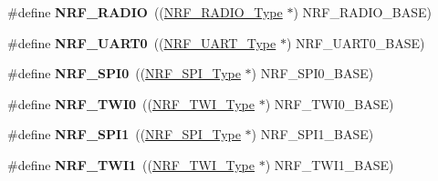 \begin{DoxyCompactItemize}
\item 
\hypertarget{group___device___peripheral___registers_ga41ac7a41fb74d5ba486e0a0bc98a16c8}{}\#define {\bfseries N\+R\+F\+\_\+\+R\+A\+D\+I\+O}~((\hyperlink{struct_n_r_f___r_a_d_i_o___type}{N\+R\+F\+\_\+\+R\+A\+D\+I\+O\+\_\+\+Type}          $\ast$) N\+R\+F\+\_\+\+R\+A\+D\+I\+O\+\_\+\+B\+A\+S\+E)\label{group___device___peripheral___registers_ga41ac7a41fb74d5ba486e0a0bc98a16c8}

\item 
\hypertarget{group___device___peripheral___registers_ga02c61604016794cbbc5963d52e18534f}{}\#define {\bfseries N\+R\+F\+\_\+\+U\+A\+R\+T0}~((\hyperlink{struct_n_r_f___u_a_r_t___type}{N\+R\+F\+\_\+\+U\+A\+R\+T\+\_\+\+Type}           $\ast$) N\+R\+F\+\_\+\+U\+A\+R\+T0\+\_\+\+B\+A\+S\+E)\label{group___device___peripheral___registers_ga02c61604016794cbbc5963d52e18534f}

\item 
\hypertarget{group___device___peripheral___registers_gaa5a6151368c81a6f039e758e61169995}{}\#define {\bfseries N\+R\+F\+\_\+\+S\+P\+I0}~((\hyperlink{struct_n_r_f___s_p_i___type}{N\+R\+F\+\_\+\+S\+P\+I\+\_\+\+Type}            $\ast$) N\+R\+F\+\_\+\+S\+P\+I0\+\_\+\+B\+A\+S\+E)\label{group___device___peripheral___registers_gaa5a6151368c81a6f039e758e61169995}

\item 
\hypertarget{group___device___peripheral___registers_gab9c8b3912be30b6f469babf985c16f33}{}\#define {\bfseries N\+R\+F\+\_\+\+T\+W\+I0}~((\hyperlink{struct_n_r_f___t_w_i___type}{N\+R\+F\+\_\+\+T\+W\+I\+\_\+\+Type}            $\ast$) N\+R\+F\+\_\+\+T\+W\+I0\+\_\+\+B\+A\+S\+E)\label{group___device___peripheral___registers_gab9c8b3912be30b6f469babf985c16f33}

\item 
\hypertarget{group___device___peripheral___registers_ga1a79f827eb039ddc7a3db7230504d71f}{}\#define {\bfseries N\+R\+F\+\_\+\+S\+P\+I1}~((\hyperlink{struct_n_r_f___s_p_i___type}{N\+R\+F\+\_\+\+S\+P\+I\+\_\+\+Type}            $\ast$) N\+R\+F\+\_\+\+S\+P\+I1\+\_\+\+B\+A\+S\+E)\label{group___device___peripheral___registers_ga1a79f827eb039ddc7a3db7230504d71f}

\item 
\hypertarget{group___device___peripheral___registers_ga9dceee329b33a198a83b2f0098f30311}{}\#define {\bfseries N\+R\+F\+\_\+\+T\+W\+I1}~((\hyperlink{struct_n_r_f___t_w_i___type}{N\+R\+F\+\_\+\+T\+W\+I\+\_\+\+Type}            $\ast$) N\+R\+F\+\_\+\+T\+W\+I1\+\_\+\+B\+A\+S\+E)\label{group___device___peripheral___registers_ga9dceee329b33a198a83b2f0098f30311}


\end{DoxyCompactItemize}
